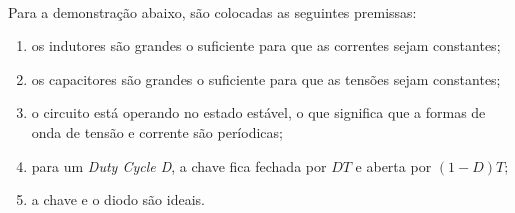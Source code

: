 \noindent
\begin{minipage}{\linewidth}
\label{sepic_topology_closed_sample}
\end{minipage}

\noindent
\begin{minipage}{\linewidth}
\label{sepic_topology_open_sample}
\end{minipage}

\paragraph{}
Para a demonstração abaixo, são colocadas as seguintes premissas:
\begin{enumerate}
    \item os indutores são grandes o suficiente para que as correntes sejam constantes;
    \item os capacitores são grandes o suficiente para que as tensões sejam constantes;
    \item o circuito está operando no estado estável, o que significa que a formas de onda de tensão e corrente são períodicas;
    \item para um \textit{Duty Cycle D}, a chave fica fechada por \textit{$DT$} e aberta por \textit{$(1 - D)T$};
    \item a chave e o diodo são ideais.
\end{enumerate}

